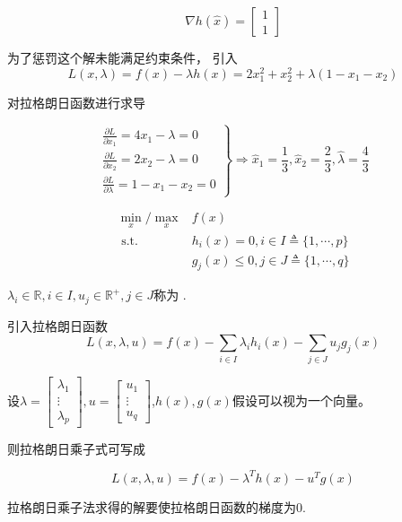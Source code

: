 \begin{equation} \nabla h(\hat{x})=\left[\begin{array}{l}1 \\ 1\end{array}\right] \end{equation}

为了惩罚这个解未能满足约束条件， 引入
\begin{equation}
L(x, \lambda)=f(x)-\lambda h(x)=2 x_{1}^{2}+x_{2}^{2}+\lambda\left(1-x_{1}-x_{2}\right)
\end{equation}

对拉格朗日函数进行求导

\begin{equation} \left.\begin{array}{l}\frac{\partial L}{\partial x_{1}}=4 x_{1}-\lambda=0 \\ \frac{\partial L}{\partial x_{2}}=2 x_{2}-\lambda=0 \\ \frac{\partial L}{\partial \lambda}=1-x_{1}-x_{2}=0\end{array}\right \} \Rightarrow \hat{x}_{1}=\frac{1}{3}, \hat{x}_{2}=\frac{2}{3}, \hat{\lambda}=\frac{4}{3} \end{equation}

\begin{definition}
    \begin{equation}\begin{aligned}
        \min _{x} / \max_{x}& f(x) \\
\text{ s.t. } & h_{i}(x)=0, i \in I \triangleq\{1, \cdots, p\} \\
&g_{j}(x) \leq 0, j \in J \triangleq\{1, \cdots, q\}
    \end{aligned}\end{equation}

$ \lambda_{i} \in \mathbb{R}, i \in {I}, u_{j} \in \mathbb{R}^{+}, j \in J $称为 .

引入拉格朗日函数 \begin{equation} L(x, \lambda, u)=f(x)-\sum_{i \in I} \lambda_{i} h_{i}(x)-\sum_{j \in J} u_{j} g_{j}(x)   \end{equation}

设$\lambda=\left[\begin{array}{c}\lambda_{1} \\ \vdots \\ \lambda_{p}\end{array}\right], u=\left[\begin{array}{c}u_{1} \\ \vdots \\ u_{q}\end{array}\right]$,$h(x),g(x)$假设可以视为一个向量。

则拉格朗日乘子式可写成


\begin{equation} L(x, \lambda, u)=f(x) - \lambda^T h(x) - u^T g(x)\end{equation}

拉格朗日乘子法求得的解要使拉格朗日函数的梯度为0.

\end{definition}

